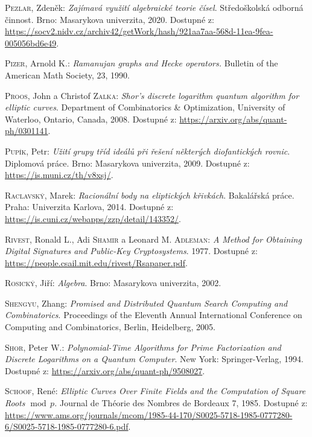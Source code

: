 \documentclass[12pt]{report}
\begin{document}
\begin{thebibliography}{97}
\textsc{Pezlar}, Zdeněk: \textit{Zajímavá využití algebraické teorie čísel}. Středoškolská odborná činnost. Brno: Masarykova univerzita, 2020. Dostupné z: \url{https://socv2.nidv.cz/archiv42/getWork/hash/921aa7aa-568d-11ea-9fea-005056bd6e49}.

\textsc{Pizer}, Arnold K.: \textit{Ramanujan graphs and Hecke operators.} Bulletin of the American Math Society, 23, 1990.

\textsc{Proos}, John a Christof \textsc{Zalka}: \textit{Shor’s discrete logarithm quantum algorithm for elliptic curves}. Department of Combinatorics \& Optimization, University of Waterloo,  Ontario, Canada, 2008. Dostupné z: \url{https://arxiv.org/abs/quant-ph/0301141}.

\textsc{Pupík}, Petr: \textit{Užití grupy tříd ideálů při řešení některých diofantických rovnic}. Diplomová práce. Brno: Masarykova univerzita, 2009. Dostupné z: \url{https://is.muni.cz/th/v8xsj/}.

\textsc{Raclavský}, Marek: \textit{Racionální body na eliptických křivkách}. Bakalářská práce. Praha: Univerzita Karlova, 2014. Dostupné z: \url{https://is.cuni.cz/webapps/zzp/detail/143352/}.

\textsc{Rivest}, Ronald L., Adi \textsc{Shamir} a Leonard M. \textsc{Adleman}: \textit{A Method for Obtaining Digital Signatures and Public-Key Cryptosystems}. 1977. Dostupné z: \url{https://people.csail.mit.edu/rivest/Rsapaper.pdf}. 

\textsc{Rosický}, Jiří: \textit{Algebra}. Brno: Masarykova univerzita, 2002.

\textsc{Shengyu}, Zhang: \textit{Promised and Distributed Quantum Search Computing and Combinatorics}. Proceedings of the Eleventh  Annual  International Conference on Computing  and Combinatorics, Berlin, Heidelberg, 2005.

\textsc{Shor}, Peter W.: \textit{Polynomial-Time Algorithms for Prime Factorization and Discrete Logarithms on a Quantum Computer}. New York: Springer-Verlag, 1994. Dostupné z: \url{https://arxiv.org/abs/quant-ph/9508027}.

\textsc{Schoof}, René: \textit{Elliptic Curves Over Finite Fields and the Computation of Square Roots $\! \operatorname{mod} \, p$.} Journal de Théorie des Nombres de Bordeaux 7, 1985. Dostupné z: \url{https://www.ams.org/journals/mcom/1985-44-170/S0025-5718-1985-0777280-6/S0025-5718-1985-0777280-6.pdf}.


\end{thebibliography}
\end{document}
